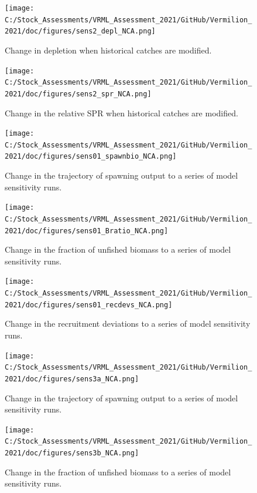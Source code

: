 \documentclass[11pt,
  english,
]{article}
\begin{document}
\FloatBarrier

\begin{figure}
\centering
\texttt{[image: C:/Stock\_Assessments/VRML\_Assessment\_2021/GitHub/Vermilion\_2021/doc/figures/sens2\_depl\_NCA.png]}
\caption{Change in depletion when historical catches are modified.\label{fig:sens2-depl}}
\end{figure}

\begin{figure}
\centering
\texttt{[image: C:/Stock\_Assessments/VRML\_Assessment\_2021/GitHub/Vermilion\_2021/doc/figures/sens2\_spr\_NCA.png]}
\caption{Change in the relative SPR when historical catches are modified.\label{fig:sens2-spr}}
\end{figure}

\FloatBarrier

\begin{figure}
\centering
\texttt{[image: C:/Stock\_Assessments/VRML\_Assessment\_2021/GitHub/Vermilion\_2021/doc/figures/sens01\_spawnbio\_NCA.png]}
\caption{Change in the trajectory of spawning output to a series of model sensitivity runs.\label{fig:sens1-spawnb}}
\end{figure}

\begin{figure}
\centering
\texttt{[image: C:/Stock\_Assessments/VRML\_Assessment\_2021/GitHub/Vermilion\_2021/doc/figures/sens01\_Bratio\_NCA.png]}
\caption{Change in the fraction of unfished biomass to a series of model sensitivity runs.\label{fig:sens1-bratio}}
\end{figure}

\begin{figure}
\centering
\texttt{[image: C:/Stock\_Assessments/VRML\_Assessment\_2021/GitHub/Vermilion\_2021/doc/figures/sens01\_recdevs\_NCA.png]}
\caption{Change in the recruitment deviations to a series of model sensitivity runs.\label{fig:sens1-recdevs}}
\end{figure}

\FloatBarrier

\begin{figure}
\centering
\texttt{[image: C:/Stock\_Assessments/VRML\_Assessment\_2021/GitHub/Vermilion\_2021/doc/figures/sens3a\_NCA.png]}
\caption{Change in the trajectory of spawning output to a series of model sensitivity runs.\label{fig:sens3a}}
\end{figure}

\begin{figure}
\centering
\texttt{[image: C:/Stock\_Assessments/VRML\_Assessment\_2021/GitHub/Vermilion\_2021/doc/figures/sens3b\_NCA.png]}
\caption{Change in the fraction of unfished biomass to a series of model sensitivity runs.\label{fig:sens3b}}
\end{figure}
\end{document}
